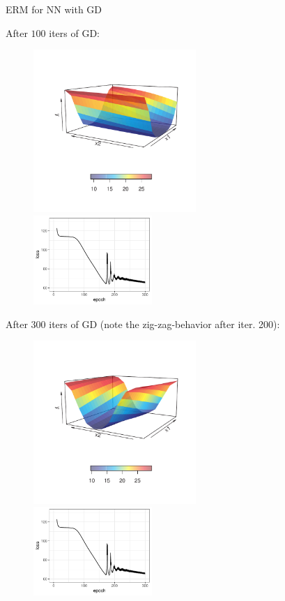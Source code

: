 \documentclass[11pt,compress,t,notes=noshow, xcolor=table]{beamer}
\begin{document}
\begin{vbframe}{ERM for NN with GD}
\framebreak 

After $100$ iters of GD: 

\begin{figure}
	\includegraphics[width=0.55\textwidth]{figure_man/gradient_descent_NN_100_surface.pdf} ~~ \includegraphics[width=0.4\textwidth]{figure_man/gradient_descent_NN_300_history.pdf}
\end{figure}

\framebreak 

After $300$ iters of GD (note the zig-zag-behavior after iter. 200):

\begin{figure}
	\includegraphics[width=0.55\textwidth]{figure_man/gradient_descent_NN_300_surface.pdf} ~~ \includegraphics[width=0.4\textwidth]{figure_man/gradient_descent_NN_300_history.pdf}
\end{figure}
\end{vbframe}
\end{document}
